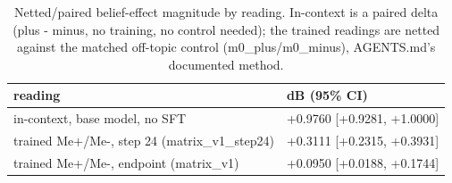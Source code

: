\begin{table}[htbp]
\centering
\footnotesize
\caption{Netted/paired belief-effect magnitude by reading. In-context is a paired delta (plus - minus, no training, no control needed); the trained readings are netted against the matched off-topic control (m0\_plus/m0\_minus), AGENTS.md's documented method.}
\label{tab:deltas}
\begin{tabular}{ p{11.84cm}l }
\toprule
reading & dB (95\% CI) \\
\midrule
in-context, base model, no SFT & +0.9760 [+0.9281, +1.0000] \\
trained Me+/Me-, step 24 (matrix\_v1\_step24) & +0.3111 [+0.2315, +0.3931] \\
trained Me+/Me-, endpoint (matrix\_v1) & +0.0950 [+0.0188, +0.1744] \\
\bottomrule
\end{tabular}
\end{table}
